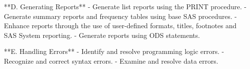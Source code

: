 **D. Generating Reports**
- Generate list reports using the PRINT procedure.
- Generate summary reports and frequency tables using base SAS procedures.
- Enhance reports through the use of user-defined formats, titles, footnotes and SAS System reporting.
- Generate reports using ODS statements.

**E. Handling Errors**
- Identify and resolve programming logic errors.
- Recognize and correct syntax errors.
- Examine and resolve data errors.
